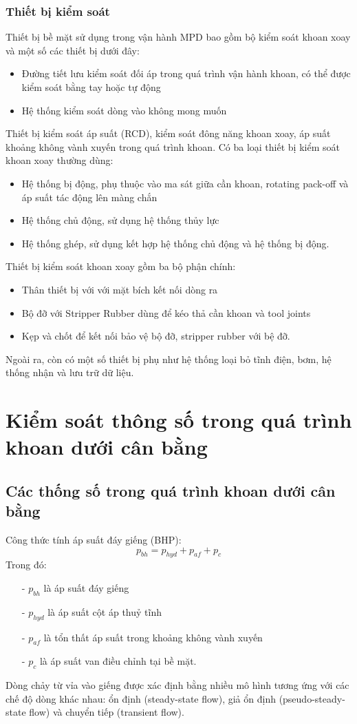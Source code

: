 \documentclass[12pt,a4paper]{article}
\begin{document}
		\subsubsection{Thiết bị kiểm soát}
		Thiết bị bề mặt sử dụng trong vận hành MPD bao gồm bộ kiểm soát khoan xoay và một số các thiết bị dưới đây:
		\begin{itemize}
			\item Đường tiết lưu kiểm soát đối áp trong quá trình vận hành khoan, có thể được kiểm soát bằng tay hoặc tự động
			\item Hệ thống kiểm soát dòng vào không mong muốn
		\end{itemize} 
		Thiết bị kiểm soát áp suất (RCD), kiểm soát đông năng khoan xoay, áp suất khoảng không vành xuyến trong quá trình khoan. Có ba loại thiết bị kiểm soát khoan xoay thường dùng:
		\begin{itemize}
			\item Hệ thống bị động, phụ thuộc vào ma sát giữa cần khoan, rotating pack-off và áp suất tác động lên màng chắn
			\item Hệ thống chủ động, sử dụng hệ thống thủy lực
			\item Hệ thống ghép, sử dụng kết hợp hệ thống chủ động và hệ thống bị động.
		\end{itemize}
		Thiết bị kiểm soát khoan xoay gồm ba bộ phận chính:
		\begin{itemize}
			\item Thân thiết bị với với mặt bích kết nối dòng ra
			\item Bộ đỡ với Stripper Rubber dùng để kéo thả cần khoan và tool joints
			\item Kẹp và chốt để kết nối bảo vệ bộ đỡ, stripper rubber với bệ đỡ.
		\end{itemize}
		Ngoài ra, còn có một số thiết bị phụ như hệ thống loại bỏ tĩnh điện, bơm, hệ thống nhận và lưu trữ dữ liệu.
\section{Kiểm soát thông số trong quá trình khoan dưới cân bằng}
\subsection{Các thống số trong quá trình khoan dưới cân bằng}
Công thức tính áp suất đáy giếng (BHP):
\begin{equation}
p_{bh} = p_{hyd}+p_{af}+p_{c}
\end{equation}
Trong đó:
\begin{itemize}
		\item[-] $p_{bh}$ là áp suất đáy giếng
		\item[-] $p_{hyd}$ là áp suất cột áp thuỷ tĩnh
		\item[-] $p_{af}$ là tổn thất áp suất trong khoảng không vành xuyến
		\item[-] $p_{c}$ là áp suất van điều chỉnh tại bề mặt.
\end{itemize}
Dòng chảy từ vỉa vào giếng được xác định bằng nhiều mô hình tương ứng với các chế độ dòng khác nhau: ổn định (steady-state flow), giả ổn định (pseudo-steady-state flow) và chuyển tiếp (transient flow).\\
\end{document}

